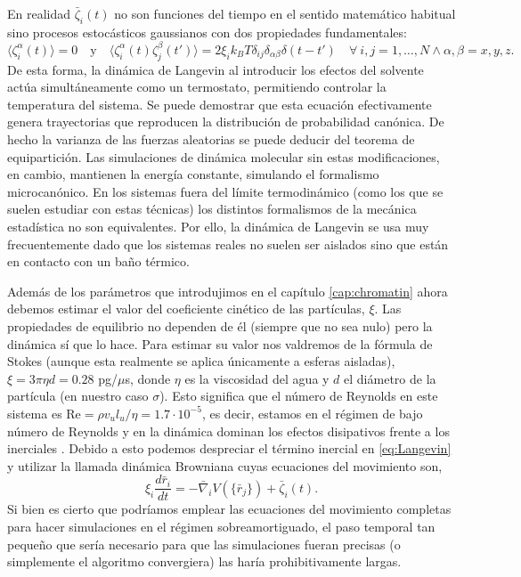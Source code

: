 En realidad $\bar{\zeta}_i(t)$ no son funciones del tiempo en el sentido matemático habitual sino procesos estocásticos gaussianos con dos propiedades fundamentales:
\begin{equation}
    \label{eq:random_forces_properties}
    \langle \zeta_i^\alpha(t) \rangle=0 \quad \text{y} \quad \langle \zeta_i^\alpha(t)\zeta_j^\beta(t') \rangle=2\xi_ik_BT\delta_{ij}\delta_{\alpha\beta}\delta(t-t') \quad \forall \ i,j=1,\dots,N \land \alpha,\beta=x,y,z.
\end{equation}
De esta forma, la dinámica de Langevin al introducir los efectos del solvente actúa simultáneamente como un termostato, permitiendo controlar la temperatura del sistema. Se puede demostrar \cite{Coffey2012} que esta ecuación efectivamente genera trayectorias que reproducen la distribución de probabilidad canónica. De hecho la varianza de las fuerzas aleatorias se puede deducir del teorema de equipartición. Las simulaciones de dinámica molecular sin estas modificaciones, en cambio, mantienen la energía constante, simulando el formalismo microcanónico. En los sistemas fuera del límite termodinámico (como los que se suelen estudiar con estas técnicas) los distintos formalismos de la mecánica estadística no son equivalentes. Por ello, la dinámica de Langevin se usa muy frecuentemente dado que los sistemas reales no suelen ser aislados sino que están en contacto con un baño térmico.

Además de los parámetros que introdujimos en el capítulo \ref{cap:chromatin} ahora debemos estimar el valor del coeficiente cinético de las partículas, $\xi$. Las propiedades de equilibrio no dependen de él (siempre que no sea nulo) pero la dinámica sí que lo hace. Para estimar su valor nos valdremos de la fórmula de Stokes (aunque esta realmente se aplica únicamente a esferas aisladas), $\xi=3\pi\eta d=0.28$ pg/$\mu$s, donde $\eta$ es la viscosidad del agua y $d$ el diámetro de la partícula (en nuestro caso $\sigma$). Esto significa que el número de Reynolds en este sistema es $\text{Re}=\rho v_ul_u/\eta=1.7\cdot 10^{-5}$, es decir, estamos en el régimen de bajo número de Reynolds y en la dinámica dominan los efectos disipativos frente a los inerciales \cite{Purcell1977}. Debido a esto podemos despreciar el término inercial en \eqref{eq:Langevin} y utilizar la llamada dinámica Browniana cuyas ecuaciones del movimiento son,
\begin{equation}
    \label{eq:Brownian}
    \xi_i\frac{d\bar{r}_i}{dt}=-\bar{\nabla}_iV\left(\{\bar{r}_j\}\right)+\bar{\zeta}_i(t).
\end{equation}
Si bien es cierto que podríamos emplear las ecuaciones del movimiento completas para hacer simulaciones en el régimen sobreamortiguado, el paso temporal tan pequeño que sería necesario para que las simulaciones fueran precisas (o simplemente el algoritmo convergiera) las haría prohibitivamente largas.

